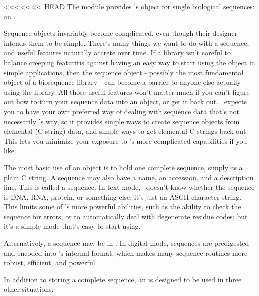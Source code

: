 <<<<<<< HEAD
The  module provides \Easel's object for single biological
sequences: an .

Sequence objects invariably become complicated, even though their
designer intends them to be simple. There's many things we want to do
with a sequence, and useful features naturally accrete over time. If a
library isn't careful to balance creeping featuritis against having an
easy way to start using the object in simple applications, then the
sequence object - possibly the most fundamental object of a
biosequence library - can become a barrier to anyone else actually
using the library. All those useful features won't matter much if you
can't figure out how to turn your sequence data into an object, or get
it back out. \Easel\ expects you to have your own preferred way of
dealing with sequence data that's not necessarily \Easel's way, so it
provides simple ways to create sequence objects from elemental (C
string) data, and simple ways to get elemental C strings back out.
This lets you minimize your exposure to \Easel's more complicated
capabilities if you like.

The most basic use of an  object is to hold one
complete sequence, simply as a plain C string. A sequence may also
have a name, an accession, and a description line.  This is called a
 sequence. In text mode, \Easel\ doesn't know
whether the sequence is DNA, RNA, protein, or something else; it's
just an ASCII character string. This limits some of \Easel's more
powerful abilities, such as the ability to check the sequence for
errors, or to automatically deal with degenerate residue codes; but
it's a simple mode that's easy to start using.

Alternatively, a sequence may be in . In digital
mode, sequences are predigested and encoded into \Easel's internal
format, which makes many sequence routines more robust, efficient, and
powerful.

In addition to storing a complete sequence, an  is
designed to be used in three other situations:

